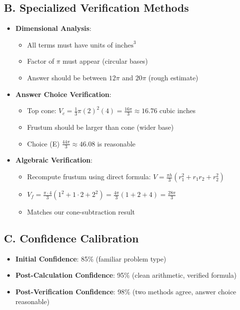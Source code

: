 \documentclass[]{article}
\begin{document}
\begin{verificationbox}
\subsection*{B. Specialized Verification Methods}
\begin{itemize}[leftmargin=*]
    \item \textbf{Dimensional Analysis}:
    \begin{itemize}
        \item All terms must have units of $\text{inches}^3$
        \item Factor of $\pi$ must appear (circular bases)
        \item Answer should be between $12\pi$ and $20\pi$ (rough estimate)
    \end{itemize}
    \item \textbf{Answer Choice Verification}:
    \begin{itemize}
        \item Top cone: $V_c = \frac{1}{3}\pi (2)^2 (4) = \frac{16\pi}{3} \approx 16.76$ cubic inches
        \item Frustum should be larger than cone (wider base)
        \item Choice (E) $\frac{44\pi}{3} \approx 46.08$ is reasonable
    \end{itemize}
    \item \textbf{Algebraic Verification}:
    \begin{itemize}
        \item Recompute frustum using direct formula: $V = \frac{\pi h}{3}(r_1^2 + r_1 r_2 + r_2^2)$
        \item $V_f = \frac{\pi \cdot 4}{3}(1^2 + 1 \cdot 2 + 2^2) = \frac{4\pi}{3}(1+2+4) = \frac{28\pi}{3}$
        \item Matches our cone-subtraction result
    \end{itemize}
\end{itemize}

\subsection*{C. Confidence Calibration}
\begin{itemize}[leftmargin=*]
    \item \textbf{Initial Confidence}: 85\% (familiar problem type)
    \item \textbf{Post-Calculation Confidence}: 95\% (clean arithmetic, verified formula)
    \item \textbf{Post-Verification Confidence}: 98\% (two methods agree, answer choice reasonable)
\end{itemize}
\end{verificationbox}
\end{document}
